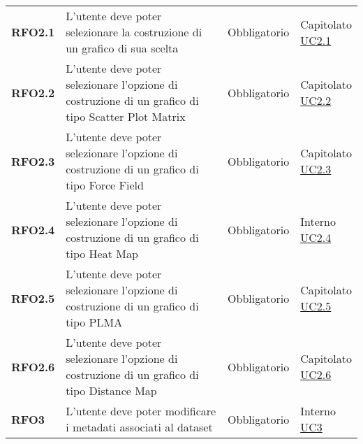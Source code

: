 \begin{longtable}[H]{| >{\raggedright\bfseries}m{20mm} | >{\raggedright}m{90mm} | >{\centering}m{25mm} | >{\centering\arraybackslash}m{30mm}|}
    RFO2.1
     & L'utente deve poter selezionare la costruzione di un grafico di sua scelta
     & Obbligatorio
     & \makecell{ Capitolato                                                                                             \\ \hyperref[ssub:uc2.1]{UC2.1}}\\

    RFO2.2
     & L'utente deve poter selezionare l'opzione di costruzione di un grafico di tipo Scatter Plot
    Matrix
     & Obbligatorio
     & \makecell{ Capitolato                                                                                             \\   \hyperref[ssub:uc2.2]{UC2.2}}\\

    RFO2.3
     & L'utente deve poter selezionare l'opzione di costruzione di un grafico di tipo Force Field
     & Obbligatorio
     & \makecell{ Capitolato                                                                                             \\  \hyperref[ssub:uc2.3]{UC2.3}}\\

    RFO2.4
     & L'utente deve poter selezionare l'opzione di costruzione di un grafico di tipo Heat Map
     & Obbligatorio
     & \makecell{ Interno                                                                                                \\  \hyperref[ssub:uc2.4]{UC2.4}}\\

    RFO2.5
     & L'utente deve poter selezionare l'opzione di costruzione di un grafico di tipo PLMA
     & Obbligatorio
     & \makecell{Capitolato                                                                                              \\ \hyperref[ssub:uc2.5]{UC2.5}}\\

    RFO2.6
     & L'utente deve poter selezionare l'opzione di costruzione di un grafico di tipo Distance Map
     & Obbligatorio
     & \makecell{Capitolato                                                                                              \\ \hyperref[ssub:uc2.6]{UC2.6}}\\

    RFO3
     & L'utente deve poter modificare i metadati associati al dataset
     & Obbligatorio
     & \makecell{ Interno                                                                                                \\  \hyperref[sub:uc3]{UC3} }\\


\end{longtable}
